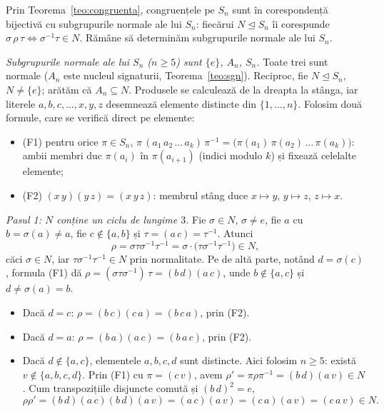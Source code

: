 \begin{solutie}
Prin Teorema~\ref{teo:congruenta}, congruențele pe $S_{n}$ sunt în corespondență
bijectivă cu subgrupurile normale ale lui $S_{n}$: fiecărui
$N\trianglelefteq S_{n}$ îi corespunde $\sigma\,\rho\,\tau\iff\sigma^{-1}\tau\in N$.
Rămâne să determinăm subgrupurile normale ale lui $S_{n}$.

\smallskip
\textit{Subgrupurile normale ale lui $S_{n}$ ($n\ge 5$) sunt $\{e\}$,
$A_{n}$, $S_{n}$.} Toate trei sunt normale ($A_{n}$ este nucleul
signaturii, Teorema~\ref{teo:sgn}). Reciproc, fie $N\trianglelefteq S_{n}$,
$N\neq\{e\}$; arătăm că $A_{n}\subseteq N$. Produsele se calculează de la
dreapta la stânga, iar literele $a,b,c,\dots,x,y,z$ desemnează elemente
distincte din $\{1,\dots,n\}$. Folosim două formule, care se verifică
direct pe elemente:
\begin{itemize}[nosep,leftmargin=1.4em]
  \item \textup{(F1)} pentru orice $\pi\in S_{n}$,
        $\pi\,(a_{1}\,a_{2}\,\dots\,a_{k})\,\pi^{-1}=\bigl(\pi(a_{1})\,\pi(a_{2})\,\dots\,\pi(a_{k})\bigr)$:
        ambii membri duc $\pi(a_{i})$ în $\pi(a_{i+1})$ (indici modulo $k$)
        și fixează celelalte elemente;
  \item \textup{(F2)} $(x\,y)(y\,z)=(x\,y\,z)$: membrul stâng duce
        $x\mapsto y$, $y\mapsto z$, $z\mapsto x$.
\end{itemize}

\smallskip
\textit{Pasul 1: $N$ conține un ciclu de lungime $3$.} Fie $\sigma\in N$,
$\sigma\neq e$, fie $a$ cu $b=\sigma(a)\neq a$, fie $c\notin\{a,b\}$ și
$\tau=(a\,c)=\tau^{-1}$. Atunci
\[
\rho=\sigma\tau\sigma^{-1}\tau^{-1}=\sigma\cdot\bigl(\tau\sigma^{-1}\tau^{-1}\bigr)\in N,
\]
căci $\sigma\in N$, iar $\tau\sigma^{-1}\tau^{-1}\in N$ prin normalitate.
Pe de altă parte, notând $d=\sigma(c)$, formula (F1) dă
$\rho=(\sigma\tau\sigma^{-1})\,\tau=(b\,d)(a\,c)$, unde $b\notin\{a,c\}$ și
$d\neq\sigma(a)=b$.
\begin{itemize}[nosep,leftmargin=1.4em]
  \item Dacă $d=c$: $\rho=(b\,c)(c\,a)=(b\,c\,a)$, prin (F2).
  \item Dacă $d=a$: $\rho=(b\,a)(a\,c)=(b\,a\,c)$, prin (F2).
  \item Dacă $d\notin\{a,c\}$, elementele $a,b,c,d$ sunt distincte. Aici
        folosim $n\ge 5$: există $v\notin\{a,b,c,d\}$. Prin (F1) cu
        $\pi=(c\,v)$, avem $\rho'=\pi\rho\pi^{-1}=(b\,d)(a\,v)\in N$. Cum
        transpozițiile disjuncte comută și $(b\,d)^{2}=e$,
        \[
        \rho\rho'=(b\,d)(a\,c)(b\,d)(a\,v)=(a\,c)(a\,v)=(c\,a)(a\,v)=(c\,a\,v)\in N.
        \]
\end{itemize}


\end{solutie}
